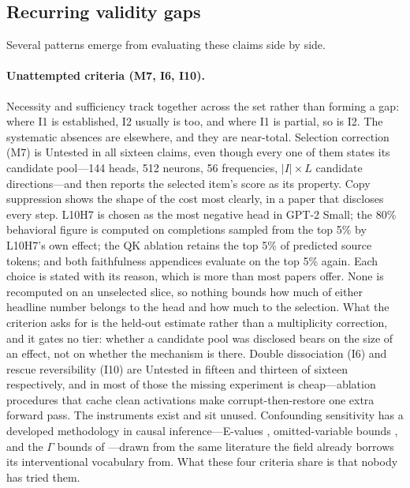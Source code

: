 \documentclass{article}
\begin{document}
\subsection{Recurring validity gaps}

Several patterns emerge from evaluating these claims side by side.

\paragraph{Unattempted criteria (M7, I6, I10).} Necessity and sufficiency track together across the set rather than forming a gap: where I1 is established, I2 usually is too, and where I1 is partial, so is I2. The systematic absences are elsewhere, and they are near-total. Selection correction (M7) is Untested in all sixteen claims, even though every one of them states its candidate pool---144 heads, 512 neurons, 56 frequencies, $|I| \times L$ candidate directions---and then reports the selected item's score as its property. Copy suppression shows the shape of the cost most clearly, in a paper that discloses every step. L10H7 is chosen as the most negative head in GPT-2 Small; the 80\% behavioral figure is computed on completions sampled from the top 5\% by L10H7's own effect; the QK ablation retains the top 5\% of predicted source tokens; and both faithfulness appendices evaluate on the top 5\% again. Each choice is stated with its reason, which is more than most papers offer. None is recomputed on an unselected slice, so nothing bounds how much of either headline number belongs to the head and how much to the selection. What the criterion asks for is the held-out estimate rather than a multiplicity correction, and it gates no tier: whether a candidate pool was disclosed bears on the size of an effect, not on whether the mechanism is there. Double dissociation (I6) and rescue reversibility (I10) are Untested in fifteen and thirteen of sixteen respectively, and in most of those the missing experiment is cheap---ablation procedures that cache clean activations make corrupt-then-restore one extra forward pass. The instruments exist and sit unused. Confounding sensitivity has a developed methodology in causal inference---E-values \citep{vanderweele2017sensitivity}, omitted-variable bounds \citep{cinelli2020making}, and the $\Gamma$ bounds of \citet{rosenbaum2002observational}---drawn from the same literature the field already borrows its interventional vocabulary from. What these four criteria share is that nobody has tried them.
\end{document}
